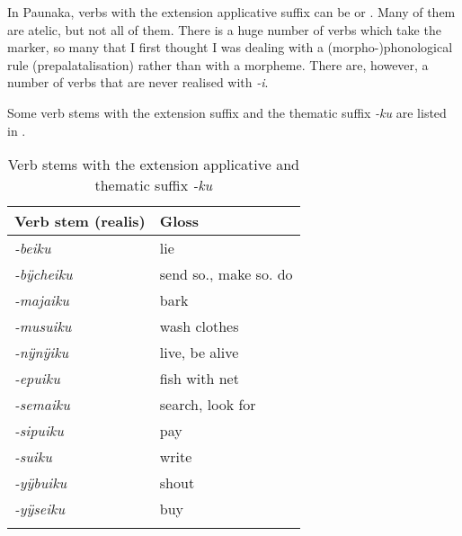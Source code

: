 In Paunaka, verbs with the extension applicative suffix can be  or . Many of them are atelic, but not all of them. There is a huge number of verbs which take the marker, so many that I first thought I was dealing with a (morpho-)phonological rule (prepalatalisation) rather than with a morpheme. There are, however, a number of verbs that are never realised with \textit{-i}. 

Some verb stems with the extension suffix and the thematic suffix \textit{-ku} are listed in .

\begin{table}
\caption{Verb stems with the extension applicative and thematic suffix \textit{-ku}}

\begin{tabular}{ll}
\lsptoprule
Verb stem (realis) & Gloss \\
\midrule
\textit{-beiku} & lie\\
\textit{-bÿcheiku} & send so., make so. do\\
\textit{-majaiku}  & bark\\
\textit{-musuiku}  & wash clothes\\
\textit{-nÿnÿiku} & live, be alive\\
\textit{-epuiku} & fish with net\\
\textit{-semaiku}  & search, look for\\
\textit{-sipuiku}  & pay\\
\textit{-suiku}  & write\\
\textit{-yÿbuiku}  & shout\\
\textit{-yÿseiku} & buy\\
\lspbottomrule
\end{tabular}

\label{table:AKT-i}
\end{table}

%
%
%

